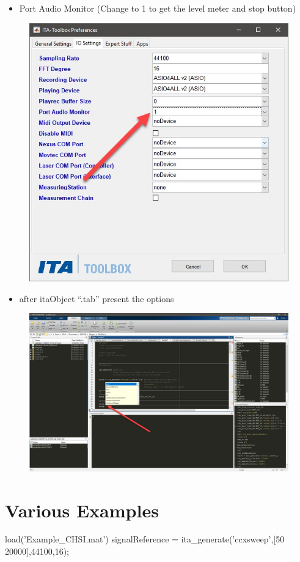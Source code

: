 \documentclass[12pt, a4paper, twoside, onecolumn]{article}%
\begin{document}
\pagebreak
\begin{itemize}
    \item Port Audio Monitor (Change to 1 to get the level meter and stop button) 
\end{itemize}

\begin{figure}[H] \centering
\includegraphics[width=.5\textwidth]{Figures/f6.jpg}
\end{figure}



\begin{itemize}
    \item after itaObject ``.tab'' present the options
\end{itemize}

\begin{figure}[H] \centering
\includegraphics[width=.7\textwidth]{Figures/f7.jpg}
\end{figure}

\section*{Various Examples}
\begin{matlabbox}

load('Example_CHSI.mat')%
signalReference = ita_generate('ccxsweep',[50 20000],44100,16); 
\end{matlabbox}
\end{document}
